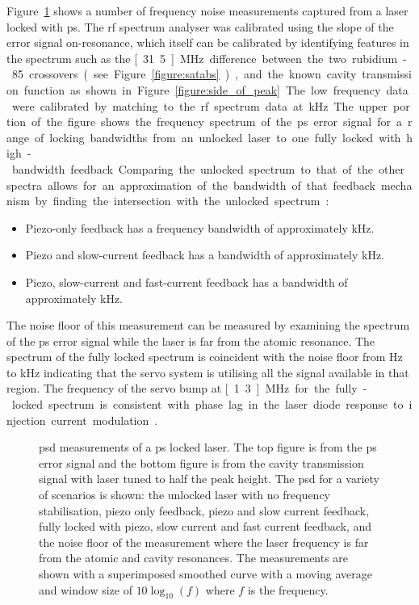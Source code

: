 Figure~\ref{figure:psd} shows a number of frequency noise measurements captured from a laser locked with \gls{ps}.
The \gls{rf} spectrum analyser was calibrated using the slope of the error signal on-resonance, which itself can be calibrated by identifying features in the spectrum such as the \unit[31.5]{MHz} difference between the two rubidium-85 crossovers (see Figure~\ref{figure:satabs}), and the known cavity transmission function as shown in Figure~\ref{figure:side_of_peak}.
The low frequency data were calibrated by matching to the \gls{rf} spectrum data at \unit[10]{kHz}.
The upper portion of the figure shows the frequency spectrum of the \gls{ps} error signal for a range of locking bandwidths from an unlocked laser to one fully locked with high-bandwidth feedback.
Comparing the unlocked spectrum to that of the other spectra allows for an approximation of the bandwidth of that feedback mechanism by finding the intersection with the unlocked spectrum:
\begin{itemize}
    \item Piezo-only feedback has a frequency bandwidth of approximately \unit[1]{kHz}.
    \item Piezo and slow-current feedback has a bandwidth of approximately \unit[50]{kHz}.
    \item Piezo, slow-current and fast-current feedback has a bandwidth of approximately \unit[500]{kHz}.
\end{itemize}
The noise floor of this measurement can be measured by examining the spectrum of the \gls{ps} error signal while the laser is far from the atomic resonance.
The spectrum of the fully locked spectrum is coincident with the noise floor from \unit[450]{Hz} to \unit[350]{kHz} indicating that the servo system is utilising all the signal available in that region.
The frequency of the servo bump at \unit[1.3]{MHz} for the fully-locked spectrum is consistent with phase lag in the laser diode response to injection current modulation~\cite{wieman_using_1991}.

\begin{figure}
\center

\caption[Laser frequency noise power spectral density from polarisation spectroscopy error signal and cavity transmission for a polarisation spectroscopy locked laser.]{\Gls{psd} measurements of a \gls{ps} locked laser.
The top figure is from the \gls{ps} error signal and the bottom figure is from the cavity transmission signal with laser tuned to half the peak height.
The \gls{psd} for a variety of scenarios is shown: the unlocked laser with no frequency stabilisation, piezo only feedback, piezo and slow current feedback, fully locked with piezo, slow current and fast current feedback, and the noise floor of the measurement where the laser frequency is far from the atomic and cavity resonances.
The measurements are shown with a superimposed smoothed curve with a moving average and window size of $10\log_{10}(f)$ where $f$ is the frequency.}
\label{figure:psd}
\end{figure}

